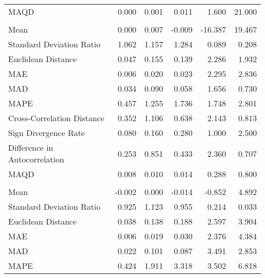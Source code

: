 \begin{landscape}
\begin{ThreePartTable}
\begin{longtable}[t]{lrrrrr}
\hspace{1em}MAQD & 0.000 & 0.001 & 0.011 & 1.600 & 21.000\\
\addlinespace[0.5em]
\multicolumn{6}{l}{\textbf{BGR}}\\
\hline
\hspace{1em}Mean & 0.000 & 0.007 & -0.009 & -16.387 & 19.467\\
\hspace{1em}Standard Deviation Ratio & 1.062 & 1.157 & 1.284 & 0.089 & 0.208\\
\hspace{1em}Euclidean Distance & 0.047 & 0.155 & 0.139 & 2.286 & 1.932\\
\hspace{1em}MAE & 0.006 & 0.020 & 0.023 & 2.295 & 2.836\\
\hspace{1em}MAD & 0.034 & 0.090 & 0.058 & 1.656 & 0.730\\
\hspace{1em}MAPE & 0.457 & 1.255 & 1.736 & 1.748 & 2.801\\
\hspace{1em}Cross-Correlation Distance & 0.352 & 1.106 & 0.638 & 2.143 & 0.813\\
\hspace{1em}Sign Divergence Rate & 0.080 & 0.160 & 0.280 & 1.000 & 2.500\\
\hspace{1em}Difference in Autocorrelation & 0.253 & 0.851 & 0.433 & 2.360 & 0.707\\
\hspace{1em}MAQD & 0.008 & 0.010 & 0.014 & 0.288 & 0.800\\
\addlinespace[0.5em]
\multicolumn{6}{l}{\textbf{BLR}}\\
\hline
\hspace{1em}Mean & -0.002 & 0.000 & -0.014 & -0.852 & 4.892\\
\hspace{1em}Standard Deviation Ratio & 0.925 & 1.123 & 0.955 & 0.214 & 0.033\\
\hspace{1em}Euclidean Distance & 0.038 & 0.138 & 0.188 & 2.597 & 3.904\\
\hspace{1em}MAE & 0.006 & 0.019 & 0.030 & 2.376 & 4.384\\
\hspace{1em}MAD & 0.022 & 0.101 & 0.087 & 3.491 & 2.853\\
\hspace{1em}MAPE & 0.424 & 1.911 & 3.318 & 3.502 & 6.818\\

\end{longtable}
\end{ThreePartTable}
\end{landscape}
